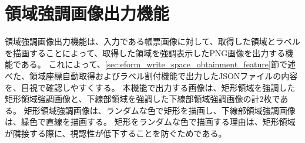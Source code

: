 \section{領域強調画像出力機能}\label{sec:highlighted_area_image_output}
領域強調画像出力機能は、入力である帳票画像に対して、取得した領域とラベルを描画することによって、取得した領域を強調表示したPNG画像を出力する機能である。
これによって、\ref{sec:eform_write_space_obtainment_feature}節で述べた、領域座標自動取得およびラベル割付機能で出力したJSONファイルの内容を、目視で確認しやすくする。
本機能で出力する画像は、矩形領域を強調した矩形領域強調画像と、下線部領域を強調した下線部領域強調画像の計2枚である。
矩形領域強調画像は、ランダムな色で矩形を描画し、下線部領域強調画像は、緑色で直線を描画する。
矩形をランダムな色で描画する理由は、矩形領域が隣接する際に、視認性が低下することを防ぐためである。

